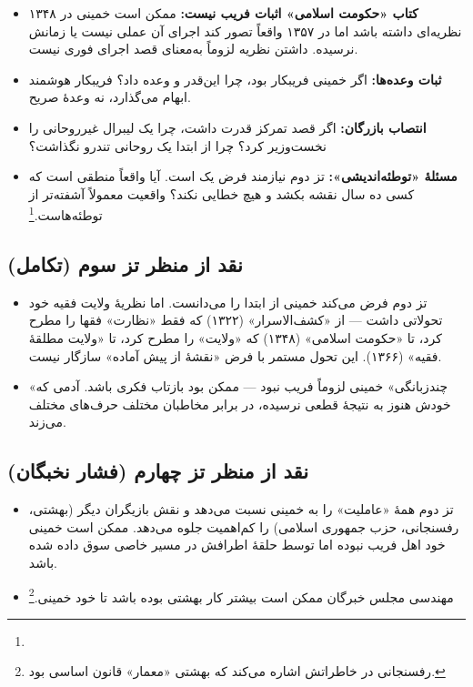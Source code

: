 \begin{itemize}[label=\textcolor{cGreen}{$\checkmark$}, rightmargin=2em]
    \item \textbf{کتاب «حکومت اسلامی» اثبات فریب نیست:} ممکن است خمینی در ۱۳۴۸ نظریه‌ای داشته باشد اما در ۱۳۵۷ واقعاً تصور کند اجرای آن عملی نیست یا زمانش نرسیده. داشتن نظریه لزوماً به‌معنای قصد اجرای فوری نیست.
    \item \textbf{ثبات وعده‌ها:} اگر خمینی فریبکار بود، چرا این‌قدر  و  وعده داد؟ فریبکار هوشمند ابهام می‌گذارد، نه وعدهٔ صریح.
    \item \textbf{انتصاب بازرگان:} اگر قصد تمرکز قدرت داشت، چرا یک لیبرال‌ غیرروحانی را نخست‌وزیر کرد؟ چرا از ابتدا یک روحانی تندرو نگذاشت؟
    \item \textbf{مسئلهٔ «توطئه‌اندیشی»:} تز دوم نیازمند فرض یک  است. آیا واقعاً منطقی است که کسی ده سال نقشه بکشد و هیچ خطایی نکند؟ واقعیت معمولاً آشفته‌تر از توطئه‌هاست.\footnote{}
\end{itemize}

\subsection{نقد از منظر تز سوم (تکامل)}

\begin{itemize}[label=\textcolor{cGold}{$\checkmark$}, rightmargin=2em]
    \item تز دوم فرض می‌کند خمینی از ابتدا  را می‌دانست. اما نظریهٔ ولایت فقیه خود تحولاتی داشت — از «کشف‌الاسرار» (۱۳۲۲) که فقط «نظارت» فقها را مطرح کرد، تا «حکومت اسلامی» (۱۳۴۸) که «ولایت» را مطرح کرد، تا «ولایت مطلقهٔ فقیه» (۱۳۶۶). این تحول مستمر با فرض «نقشهٔ از پیش آماده» سازگار نیست.
    \item «چندزبانگی» خمینی لزوماً فریب نبود — ممکن بود بازتاب  فکری باشد. آدمی که خودش هنوز به نتیجهٔ قطعی نرسیده، در برابر مخاطبان مختلف حرف‌های مختلف می‌زند.
\end{itemize}

\subsection{نقد از منظر تز چهارم (فشار نخبگان)}

\begin{itemize}[label=\textcolor{cConsolid}{$\checkmark$}, rightmargin=2em]
    \item تز دوم همهٔ «عاملیت» را به خمینی نسبت می‌دهد و نقش بازیگران دیگر (بهشتی، رفسنجانی، حزب جمهوری اسلامی) را کم‌اهمیت جلوه می‌دهد. ممکن است خمینی خود اهل فریب نبوده اما توسط حلقهٔ اطرافش در مسیر خاصی سوق داده شده باشد.
    \item مهندسی مجلس خبرگان ممکن است بیشتر کار بهشتی بوده باشد تا خود خمینی.\footnote{رفسنجانی در خاطراتش اشاره می‌کند که بهشتی «معمار» قانون اساسی بود.}
\end{itemize}

